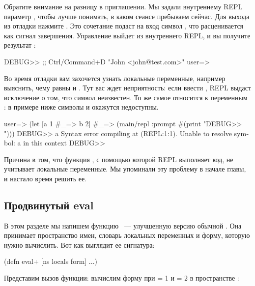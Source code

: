 Обратите внимание на разницу в приглашении. Мы задали внутреннему REPL параметр , чтобы лучше понимать, в каком сеансе пребываем сейчас. Для выхода из отладки нажмите . Это сочетание подаст на вход символ , что расценивается как сигнал завершения. Управление выйдет из внутреннего REPL, и вы получите результат :

\begin{english}
  \begin{text}
DEBUG>> ;; Ctrl/Command+D
"John <john@test.com>"
user=>
  \end{text}
\end{english}

Во время отладки вам захочется узнать локальные переменные, например выяснить, чему равны  и . Тут вас ждет неприятность: если ввести , REPL выдаст исключение о том, что символ неизвестен. То же самое относится к переменным : в примере ниже символы  и  окажутся недоступны.

\begin{english}
  \begin{text}
user=> (let [a 1
  #_=>       b 2]
  #_=>   (main/repl :prompt #(print "DEBUG>> ")))
DEBUG>> a
Syntax error compiling at (REPL:1:1).
Unable to resolve symbol: a in this context
DEBUG>>
  \end{text}
\end{english}

Причина в том, что функция , с помощью которой REPL выполняет код, не учитывает локальные переменные. Мы упоминали эту проблему в начале главы, и настало время решить ее.

\subsection{Продвинутый eval}

В этом разделе мы напишем функцию ~--- улучшенную версию обычной . Она принимает пространство имен, словарь локальных переменных и форму, которую нужно вычислить. Вот как выглядит ее сигнатура:

\begin{english}
  \begin{clojure}
(defn eval+ [ns locals form]
  ...)
  \end{clojure}
\end{english}

Представим вызов функции: вычислим форму  при  = 1 и  = 2 в пространстве :

